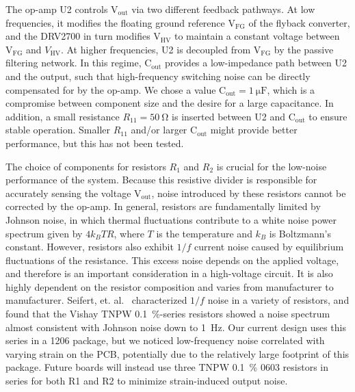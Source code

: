 \documentclass[aip,rsi,reprint]{revtex4-1} %
\begin{document}
The op-amp U2 controls $\text{V}_\text{out}$ via two different feedback pathways.
At low frequencies, it modifies the floating ground reference $\text{V}_\text{FG}$ of the flyback converter, and the DRV2700 in turn modifies $\text{V}_\text{HV}$ to maintain a constant voltage between $\text{V}_\text{FG}$ and $V_\text{HV}$.
At higher frequencies, U2 is decoupled from $\text{V}_\text{FG}$ by the passive filtering network.
In this regime, $\text{C}_\text{out}$ provides a low-impedance path between U2 and the output, such that high-frequency switching noise can be directly compensated for by the op-amp.
We chose a value $\text{C}_\text{out}=\SI{1}{\micro\farad}$, which is a compromise between component size and the desire for a large capacitance.
In addition, a small resistance $R_{11} = \SI{50}{\ohm}$ is inserted between U2 and $\text{C}_\text{out}$ to ensure stable operation.
Smaller $R_{11}$ and/or larger $\text{C}_\text{out}$ might provide better performance, but this has not been tested.

The choice of components for resistors $R_1$ and $R_2$ is crucial for the low-noise performance of the system.
Because this resistive divider is responsible for accurately sensing the voltage $\text{V}_\text{out}$, noise introduced by these resistors cannot be corrected by the op-amp.
In general, resistors are fundamentally limited by Johnson noise, in which thermal fluctuations contribute to a white noise power spectrum given by $4 k_B T R$, where $T$ is the temperature and $k_B$ is Boltzmann's constant.\cite{Horowitz2015a:JN}
However, resistors also exhibit $1/f$ current noise caused by equilibrium fluctuations of the resistance.\cite{Clarke1974a,Voss1976a}
This excess noise depends on the applied voltage, and therefore is an important consideration in a high-voltage circuit.
It is also highly dependent on the resistor composition and varies from manufacturer to manufacturer.
Seifert, et. al.~\cite{Seifert2009a} characterized $1/f$ noise in a variety of resistors, and found that the Vishay TNPW \SI{0.1}{\percent}-series resistors showed a noise spectrum almost consistent with Johnson noise down to \SI{1}{\hertz}.
Our current design uses this series in a 1206 package, but we noticed low-frequency noise correlated with varying strain on the PCB, potentially due to the relatively large footprint of this package.
Future boards will instead use three TNPW \SI{0.1}{\percent} 0603 resistors in series for both R1 and R2 to minimize strain-induced output noise.
\end{document}

